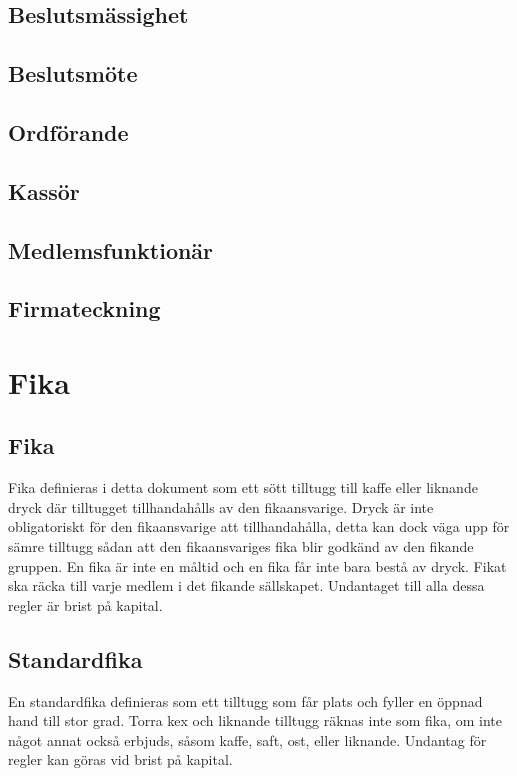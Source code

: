 \documentclass{article}
\begin{document}
\subsection{Beslutsmässighet}

\subsection{Beslutsmöte}

\subsection{Ordförande}

\subsection{Kassör}

\subsection{Medlemsfunktionär}

\subsection{Firmateckning}

\section{Fika} \label{fika}
\subsection{Fika} \label{fikafika} %
Fika definieras i detta dokument som ett sött tilltugg till kaffe eller liknande
dryck där tilltugget tillhandahålls av den fikaansvarige. Dryck är inte
obligatoriskt för den fikaansvarige att tillhandahålla, detta kan dock väga upp
för sämre tilltugg sådan att den fikaansvariges fika blir godkänd av den fikande
gruppen. En fika är inte en måltid och en fika får inte bara bestå av dryck.
Fikat ska räcka till varje medlem i det fikande sällskapet. Undantaget till alla
dessa regler är brist på kapital.

\subsection{Standardfika} \label{fikastandard} %
En standardfika definieras som ett tilltugg som får plats och fyller en öppnad
hand till stor grad. Torra kex och liknande tilltugg räknas inte som fika, om
inte något annat också erbjuds, såsom kaffe, saft, ost, eller liknande. Undantag
för regler kan göras vid brist på kapital.
\end{document}
